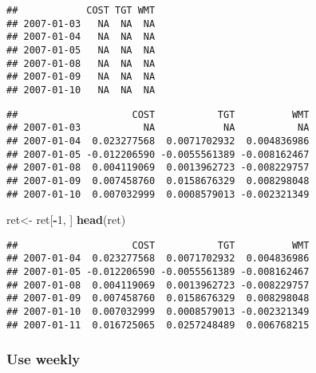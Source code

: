 \documentclass[]{article}
\newenvironment{Shaded}{\begin{snugshade}}{\end{snugshade}}
\newcommand{\DecValTok}[1]{\textcolor[rgb]{0.00,0.00,0.81}{#1}}
\newcommand{\KeywordTok}[1]{\textcolor[rgb]{0.13,0.29,0.53}{\textbf{#1}}}
\newcommand{\NormalTok}[1]{#1}
\newcommand{\OperatorTok}[1]{\textcolor[rgb]{0.81,0.36,0.00}{\textbf{#1}}}
\newcommand{\StringTok}[1]{\textcolor[rgb]{0.31,0.60,0.02}{#1}}
\begin{document}
\begin{verbatim}
##            COST TGT WMT
## 2007-01-03   NA  NA  NA
## 2007-01-04   NA  NA  NA
## 2007-01-05   NA  NA  NA
## 2007-01-08   NA  NA  NA
## 2007-01-09   NA  NA  NA
## 2007-01-10   NA  NA  NA
\end{verbatim}

\begin{Shaded}
\end{Shaded}

\begin{verbatim}
##                    COST           TGT          WMT
## 2007-01-03           NA            NA           NA
## 2007-01-04  0.023277568  0.0071702932  0.004836986
## 2007-01-05 -0.012206590 -0.0055561389 -0.008162467
## 2007-01-08  0.004119069  0.0013962723 -0.008229757
## 2007-01-09  0.007458760  0.0158676329  0.008298048
## 2007-01-10  0.007032999  0.0008579013 -0.002321349
\end{verbatim}

\begin{Shaded}
\begin{Highlighting}[]
\NormalTok{ret<-}\StringTok{ }\NormalTok{ret[}\OperatorTok{-}\DecValTok{1}\NormalTok{, ]}
\KeywordTok{head}\NormalTok{(ret)}
\end{Highlighting}
\end{Shaded}

\begin{verbatim}
##                    COST           TGT          WMT
## 2007-01-04  0.023277568  0.0071702932  0.004836986
## 2007-01-05 -0.012206590 -0.0055561389 -0.008162467
## 2007-01-08  0.004119069  0.0013962723 -0.008229757
## 2007-01-09  0.007458760  0.0158676329  0.008298048
## 2007-01-10  0.007032999  0.0008579013 -0.002321349
## 2007-01-11  0.016725065  0.0257248489  0.006768215
\end{verbatim}

\hypertarget{use-weekly}{%
\subsubsection{Use weekly}\label{use-weekly}}
\end{document}
